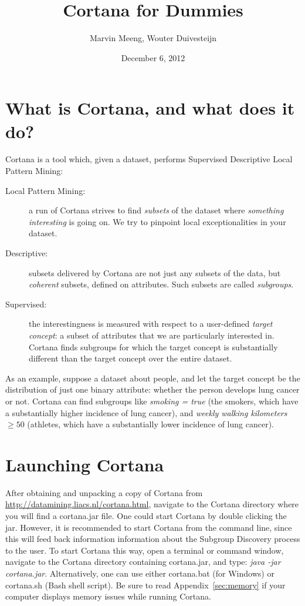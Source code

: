 \documentclass{article}
\title{Cortana for Dummies}
\author{Marvin Meeng, Wouter Duivesteijn}
\date{December 6, 2012}
\begin{document}
\maketitle

\section{What is Cortana, and what does it do?}
\label{sec:intro}

Cortana is a tool which, given a dataset, performs Supervised Descriptive
Local Pattern Mining:
\begin{description}
\item[Local Pattern Mining:] a run of Cortana strives to find \emph{subsets}
of the dataset where \emph{something interesting} is going on. We try to
pinpoint local exceptionalities in your dataset.
\item[Descriptive:] subsets delivered by Cortana are not just any subsets of
the data, but \emph{coherent} subsets, defined on attributes. Such subsets
are called \emph{subgroups}.
\item[Supervised:] the interestingness is measured with respect to a
user-defined \emph{target concept}: a subset of attributes that we are
particularly interested in. Cortana finds subgroups for which the target
concept is substantially different than the target concept over the entire
dataset.
\end{description}

As an example,
suppose a dataset about people, and let the target concept be the
distribution of just one binary attribute: whether the person develops lung
cancer or not.  Cortana can find subgroups like \emph{smoking = true} (the
smokers, which have a substantially higher incidence of lung cancer), and
\emph{weekly walking kilometers} $\geq 50$ (athletes, which have a
substantially lower incidence of lung cancer).

\section{Launching Cortana}

After obtaining and unpacking a copy of Cortana from
\url{http://datamining.liacs.nl/cortana.html}, navigate to the Cortana
directory where you will find a cortana.jar file.  One could start Cortana
by double clicking the jar.  However, it is recommended to start Cortana
from the command line, since this will feed back information information
about the Subgroup Discovery process to the user.  To start Cortana this
way, open a terminal or command window, navigate to the Cortana directory
containing cortana.jar, and type: \emph{java -jar cortana.jar}. 
Alternatively, one can use either cortana.bat (for Windows) or cortana.sh
(Bash shell script).  Be sure to read Appendix~\ref{sec:memory} if your
computer displays memory issues while running Cortana.
\end{document}
